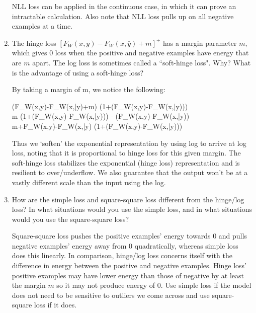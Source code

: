 \documentclass{article}
\begin{document}
\begin{enumerate}
\begin{tcolorbox}
		      NLL loss can be applied in the continuous case, in
		      which it can prove an intractable calculation. Also note that NLL loss pulls up
		      on all negative examples at a time.
	      \end{tcolorbox}
	\item The hinge loss $[F_W(x, y)- F_W (x, \bar{y}) + m]^{+}$
	      has a margin parameter $m$, which gives 0 loss when the positive and negative
	      examples have energy that are $m$ apart. The log loss is sometimes called a
	      ``soft-hinge loss". Why? What is the advantage of using a soft-hinge loss?
	      \begin{tcolorbox}
		      By taking a margin of m, we notice the following:
			  \begin{flalign*}
				 \exp(F_W(x,y)-F_W(x,\bar{y})+m) \propto  (1+\exp(F_W(x,y)-F_W(x,\bar{y})))\\
				\implies m \propto \log (1+\exp(F_W(x,y)-F_W(x,\bar{y}))) - (F_W(x,y)-F_W(x,\bar{y}))\\
				\therefore m+F_W(x,y)-F_W(x,\bar{y}) \propto  \log (1+\exp(F_W(x,y)-F_W(x,\bar{y})))
			  \end{flalign*}

			   Thus we `soften' the exponential representation by using log to arrive at log loss, noting that it
			   is proportional to hinge loss for this given margin. The soft-hinge loss stabilizes the exponential (hinge loss) 
			   representation and is resilient to over/underflow. We also guarantee that the 
			   output won't be at a vastly different scale than the input using the log.
	      \end{tcolorbox}
	\item How are the simple loss and square-square loss different
	      from the hinge/log loss? In what situations would you use the simple loss, and
	      in what situations would you use the square-square loss?
	      \begin{tcolorbox}
		      Square-square loss pushes the positive examples' energy
		      towards 0 and pulls negative examples' energy away from 0 quadratically,
		      whereas simple loss does this linearly. In comparison, hinge/log loss concerns
		      itself with the difference in energy between the positive and negative
		      examples. Hinge loss' positive examples may have lower energy than those of negative by at
		      least the margin $m$ so it may not produce energy of 0. Use
		      simple loss if the model does not need to be sensitive to outliers we come
		      across and use square-square loss if it does.
	      \end{tcolorbox}
\end{enumerate}
\end{document}
